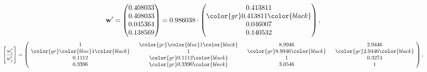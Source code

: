\begin{example}
\begin{equation*}
\mathbf{w}^{\prime} =
\begin{pmatrix}
0.408033\\
0.408033\\
0.045364\\
0.138569
\end{pmatrix} =
0.986038\cdot
\begin{pmatrix}
0.413811\\
\color{gr} 0.413811\color{black} \\
0.046007\\
0.140532
\end{pmatrix},
\end{equation*}
\begin{equation*}
\left[ \frac{{w}^{\prime}_i}{{w}^{\prime}_j} \right] =
\begin{pmatrix}
$\,\,$ 1 $\,\,$ & $\,\,$\color{gr} \color{blue} 1\color{black} $\,\,$ & $\,\,$8.9946$\,\,$ & $\,\,$2.9446$\,\,$ \\
$\,\,$\color{gr} \color{blue} 1\color{black} $\,\,$ & $\,\,$ 1 $\,\,$ & $\,\,$\color{gr} 8.9946\color{black} $\,\,$ & $\,\,$\color{gr} 2.9446\color{black}   $\,\,$ \\
$\,\,$0.1112$\,\,$ & $\,\,$\color{gr} 0.1112\color{black} $\,\,$ & $\,\,$ 1 $\,\,$ & $\,\,$0.3274 $\,\,$ \\
$\,\,$0.3396$\,\,$ & $\,\,$\color{gr} 0.3396\color{black} $\,\,$ & $\,\,$3.0546$\,\,$ & $\,\,$ 1  $\,\,$ \\
\end{pmatrix},
\end{equation*}
\end{example}
\newpage
